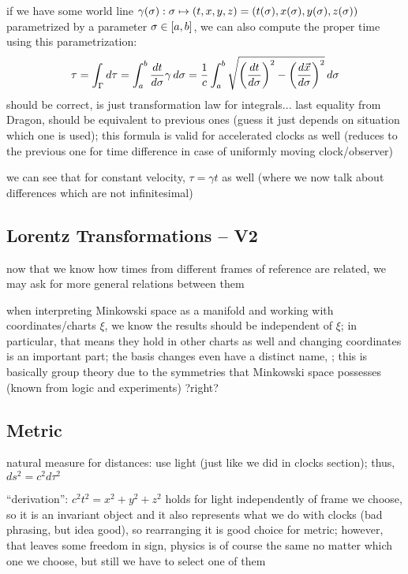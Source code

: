 if we have some world line $\gamma(\sigma): \sigma \mapsto \qty(t, x, y, z) = \qty(t(\sigma), x(\sigma), y(\sigma), z(\sigma))$ parametrized by a parameter $\sigma \in \qty[a, b]$, we can also compute the proper time using this parametrization:
\begin{equation}
\tau = \int_\Gamma d\tau = \int_a^b \dv{t}{\sigma} \gamma \, d\sigma = \frac{1}{c} \int_a^b \sqrt{\qty(\dv{t}{\sigma})^2 - \qty(\dv{\vec{x}}{\sigma})^2} \, d\sigma
\end{equation}
should be correct, is just transformation law for integrals... last equality from Dragon, should be equivalent to previous ones (guess it just depends on situation which one is used); this formula is valid for accelerated clocks as well (reduces to the previous one for time difference in case of uniformly moving clock/observer)


we can see that for constant velocity, $\tau = \gamma t$ as well (where we now talk about differences which are not infinitesimal)



		\subsection{Lorentz Transformations -- V2}
now that we know how times from different frames of reference are related, we may ask for more general relations between them


when interpreting Minkowski space as a manifold and working with coordinates/charts $\xi$, we know the results should be independent of $\xi$; in particular, that means they hold in other charts as well and changing coordinates is an important part; the basis changes even have a distinct name, ; this is basically group theory due to the symmetries that Minkowski space possesses (known from logic and experiments) ?right?



		\subsection{Metric}
natural measure for distances: use light (just like we did in clocks section); thus, $ds^2 = c^2 d\tau^2$

\enquote{derivation}: $c^2 t^2 = x^2 + y^2 + z^2$ holds for light independently of frame we choose, so it is an invariant object and it also represents what we do with clocks (bad phrasing, but idea good), so rearranging it is good choice for metric; however, that leaves some freedom in sign, physics is of course the same no matter which one we choose, but still we have to select one of them


